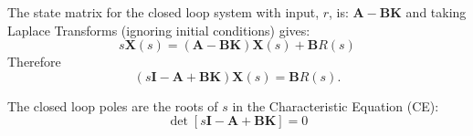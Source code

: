 The state matrix for the closed loop system with input, $r$,  is:  $\mathbf{A}-\mathbf{BK}$ and taking Laplace Transforms  (ignoring initial conditions) gives:
\[
	s\mathbf{X}(s) = (\mathbf{A}-\mathbf{BK})\mathbf{X}(s) + \mathbf{B}R(s)
\]
Therefore 
\[
    (s\mathbf{I}-\mathbf{A}+\mathbf{BK})\mathbf{X}(s) = \mathbf{B}R(s).
\]

The closed loop poles are the roots of $s$ in the Characteristic Equation (CE):
\begin{equation}
	\label{eq:1}
	\det\left[s\mathbf{I}-\mathbf{A}+\mathbf{BK}\right]=0
\end{equation}
\endinput

